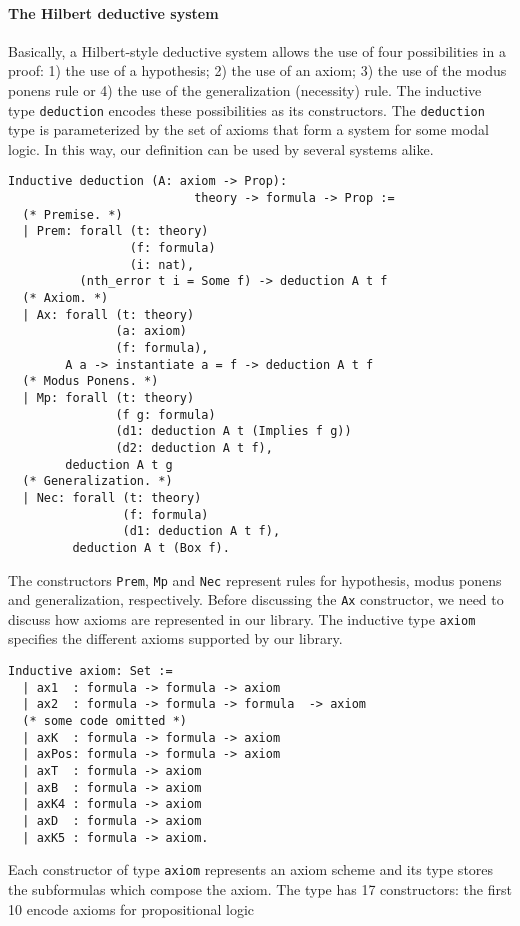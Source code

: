 \documentclass[sigconf]{acmart}
\begin{document}
\paragraph{The Hilbert deductive system}
Basically, a Hilbert-style deductive system allows the use of four
possibilities in a proof: 1) the use of a hypothesis; 2) the use of an axiom;
3) the use of the modus ponens rule or 4) the use of the generalization (necessity)
rule. The inductive type \texttt{deduction} encodes these possibilities
as its constructors. The \texttt{deduction} type is parameterized by
the set of axioms that form a system for some modal logic. In this way, our definition can be
used by several systems alike.
\begin{verbatim}
Inductive deduction (A: axiom -> Prop):
                          theory -> formula -> Prop :=
  (* Premise. *)
  | Prem: forall (t: theory)
                 (f: formula)
                 (i: nat),
          (nth_error t i = Some f) -> deduction A t f
  (* Axiom. *)
  | Ax: forall (t: theory)
               (a: axiom)
               (f: formula),
        A a -> instantiate a = f -> deduction A t f
  (* Modus Ponens. *)
  | Mp: forall (t: theory)
               (f g: formula)
               (d1: deduction A t (Implies f g))
               (d2: deduction A t f),
        deduction A t g
  (* Generalization. *)
  | Nec: forall (t: theory)
                (f: formula)
                (d1: deduction A t f),
         deduction A t (Box f).
\end{verbatim}
The constructors \texttt{Prem}, \texttt{Mp} and \texttt{Nec}
represent rules for hypothesis, modus ponens and generalization, respectively.
Before discussing the \texttt{Ax} constructor, we need to discuss how axioms are
represented in our library. The inductive type \texttt{axiom} specifies
the different axioms supported by our library.
\begin{verbatim}
Inductive axiom: Set :=
  | ax1  : formula -> formula -> axiom
  | ax2  : formula -> formula -> formula  -> axiom
  (* some code omitted *)
  | axK  : formula -> formula -> axiom
  | axPos: formula -> formula -> axiom
  | axT  : formula -> axiom
  | axB  : formula -> axiom
  | axK4 : formula -> axiom
  | axD  : formula -> axiom
  | axK5 : formula -> axiom.
\end{verbatim}
Each constructor of type \texttt{axiom} represents an axiom scheme and
its type stores the subformulas which compose the axiom. The type has
17 constructors: the first 10 encode axioms for propositional logic
\end{document}
